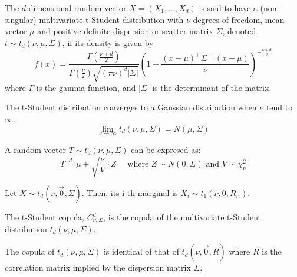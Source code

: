 \documentclass[11pt,fleqn]{book} %
\begin{document}
\begin{definition}
	The $d$-dimensional random vector $X=(X_1,\dots,X_d)$ is said to have a 
	(non-singular) multivariate t-Student distribution with $\nu$ degrees of freedom, 
	mean vector $\mu$ and positive-definite dispersion or scatter matrix $\Sigma$, 
	denoted $t \sim t_d(\nu,\mu,\Sigma)$, if its density is given by
	\begin{displaymath}
		f(x)=\frac{\Gamma\left(\frac{\nu+d}{2}\right)}{\Gamma\left(\frac{\nu}{2}\right)\sqrt{(\pi \nu)^d |\Sigma|}}
		\left(
		1+ \frac{(x-\mu)^\top\Sigma^{-1}(x-\mu)}{\nu}
		\right)^{-\frac{\nu+d}{2}}
	\end{displaymath}
	\noindent where $\Gamma$ is the gamma function, and $|\Sigma|$ is the 
	determinant of the matrix.
\end{definition}

\begin{proposition}
	The t-Student distribution converges to a Gaussian distribution 
	when $\nu$ tend to $\infty$.
	\begin{displaymath}
		\lim_{\nu \to \infty} t_d(\nu,\mu,\Sigma) = N(\mu,\Sigma)
	\end{displaymath}
\end{proposition}

\begin{proposition}
	\label{prop:mtschar}
	A random vector $T \sim t_d(\nu,\mu,\Sigma)$ can be expresed as:
	\begin{displaymath}
		T \stackrel{d}{=} \mu + \sqrt{\frac{\nu}{V}}\cdot Z
		\quad \text{ where } Z \sim N(0,\Sigma) \text{ and } V \sim \chi_{\nu}^2
	\end{displaymath}
\end{proposition}

\begin{proposition} \cite{kotz:2004}
	Let $X \sim t_d(\nu,\vec{0},\Sigma)$. Then, its i-th marginal is 
	$X_i \sim t_1(\nu,0,R_{ii})$.
\end{proposition}

\begin{definition}
	The t-Student copula, $C_{\nu,\Sigma}^d$, is the copula of the multivariate 
	t-Student distribution $t_d(\nu,\mu,\Sigma)$.
\end{definition}

\begin{proposition}
	The copula of $t_d(\nu,\mu,\Sigma)$ is identical of that of $t_d(\nu,\vec{0},R)$
	where $R$ is the correlation matrix implied by the dispersion matrix $\Sigma$.
\end{proposition}
\end{document}

